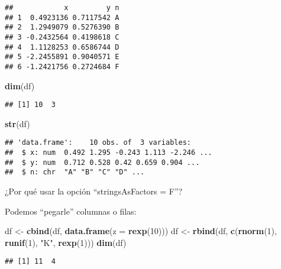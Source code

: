 \documentclass[]{article}
\newenvironment{Shaded}{\begin{snugshade}}{\end{snugshade}}
\newcommand{\KeywordTok}[1]{\textcolor[rgb]{0.13,0.29,0.53}{\textbf{{#1}}}}
\newcommand{\DataTypeTok}[1]{\textcolor[rgb]{0.13,0.29,0.53}{{#1}}}
\newcommand{\DecValTok}[1]{\textcolor[rgb]{0.00,0.00,0.81}{{#1}}}
\newcommand{\StringTok}[1]{\textcolor[rgb]{0.31,0.60,0.02}{{#1}}}
\newcommand{\NormalTok}[1]{{#1}}
\begin{document}
\begin{verbatim}
##            x         y n
## 1  0.4923136 0.7117542 A
## 2  1.2949079 0.5276390 B
## 3 -0.2432564 0.4198618 C
## 4  1.1128253 0.6586744 D
## 5 -2.2455891 0.9040571 E
## 6 -1.2421756 0.2724684 F
\end{verbatim}

\begin{Shaded}
\begin{Highlighting}[]
\KeywordTok{dim}\NormalTok{(df)}
\end{Highlighting}
\end{Shaded}

\begin{verbatim}
## [1] 10  3
\end{verbatim}

\begin{Shaded}
\begin{Highlighting}[]
\KeywordTok{str}\NormalTok{(df)}
\end{Highlighting}
\end{Shaded}

\begin{verbatim}
## 'data.frame':    10 obs. of  3 variables:
##  $ x: num  0.492 1.295 -0.243 1.113 -2.246 ...
##  $ y: num  0.712 0.528 0.42 0.659 0.904 ...
##  $ n: chr  "A" "B" "C" "D" ...
\end{verbatim}

\begin{curiosidad}
¿Por qué usar la opción ``stringsAsFactors = F''?
\end{curiosidad}

Podemos ``pegarle'' columnas o filas:

\begin{Shaded}
\begin{Highlighting}[]
\NormalTok{df <-}\StringTok{ }\KeywordTok{cbind}\NormalTok{(df, }\KeywordTok{data.frame}\NormalTok{(}\DataTypeTok{z =} \KeywordTok{rexp}\NormalTok{(}\DecValTok{10}\NormalTok{)))}
\NormalTok{df <-}\StringTok{ }\KeywordTok{rbind}\NormalTok{(df, }\KeywordTok{c}\NormalTok{(}\KeywordTok{rnorm}\NormalTok{(}\DecValTok{1}\NormalTok{), }\KeywordTok{runif}\NormalTok{(}\DecValTok{1}\NormalTok{), }\StringTok{"K"}\NormalTok{, }\KeywordTok{rexp}\NormalTok{(}\DecValTok{1}\NormalTok{)))}
\KeywordTok{dim}\NormalTok{(df)}
\end{Highlighting}
\end{Shaded}

\begin{verbatim}
## [1] 11  4
\end{verbatim}
\end{document}
